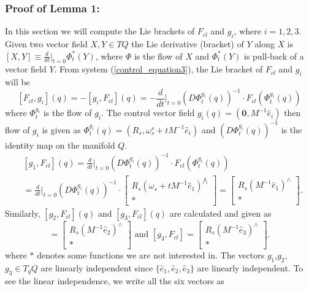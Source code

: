 \documentclass{ifacconf}
\begin{document}
\subsubsection{Proof of Lemma 1:} 
\label{A3}
In this section we will compute the Lie brackets of $F_{cl}$ and $g_{i}$, where $i=1,2,3$. Given two vector field $X,Y \in TQ$ the Lie derivative (bracket) of $Y$ along $X$ is $[X,Y] \equiv \frac{d}{dt}|_{t=0}\Phi_{t}^{*}(Y)$, 
where $\Phi$ is the flow of $X$ and $\Phi_{t}^{*}(Y)$ is pull-back of a vector field $Y$. From system (\ref{control_equation3}), the Lie bracket of $F_{cl}$ and $g_{i}$ will be
\begin{equation}\nonumber
[F_{cl},g_{i}](q) = -[g_{i},F_{cl}](q) = - \frac{d}{dt}|_{t=0} (D\Phi_{t}^{g_{i}}(q))^{-1}\cdot F_{cl}(\Phi_{t}^{g_{i}}(q))
\end{equation}
where $\Phi_{t}^{g_{i}}$ is the flow of $g_{i}$. The control vector field $g_{i}(q) = (\mathbf{0}, M^{-1}\hat{e}_{i})$  
then flow of $g_{i}$ is given as $\Phi_{t}^{g_{i}}(q) = \left(R_{s},\omega_{s}^{s} + t M^{-1}\hat{e}_{i}  \right)$ 
and $(D\Phi_{t}^{g_{i}}(q))^{-1}$ is the identity map on the manifold $Q$.
\begin{align*}
& [g_{1},F_{cl}](q) = \frac{d}{dt}|_{t=0} (D\Phi_{t}^{g_{i}}(q))^{-1}\cdot F_{cl}(\Phi_{t}^{g_{i}}(q)) \nonumber \\
& = \frac{d}{dt}|_{t=0} (D\Phi_{t}^{g_{i}}(q))^{-1}\cdot \begin{bmatrix}
R_{s}(\omega_{s} + t M^{-1}\hat{e}_{1})^{\bigwedge} \\
\ast
\end{bmatrix} = \begin{bmatrix}
R_{s}(M^{-1}\hat{e}_{1})^{\wedge}\\
\ast
\end{bmatrix}.
\end{align*}
Similarly, $[g_{2},F_{cl}](q)$ and $[g_{3},F_{cl}](q)$ are calculated and given as
\begin{equation*}
[g_{2},F_{cl}] = \begin{bmatrix}
R_{s}(M^{-1}\hat{e}_{2})^{\wedge}\\
\ast
\end{bmatrix}\mbox{   and   }
[g_{3},F_{cl}] = \begin{bmatrix}
R_{s}(M^{-1}\hat{e}_{3})^{\wedge}\\
\ast
\end{bmatrix}.
\end{equation*}
where $\ast$ denotes some functions we are not interested in. The vectors $g_{1}$,$g_{2}$,$g_{3}\in T_{q}Q$ are linearly independent since $\{\hat{e}_{1},\hat{e}_{2},\hat{e}_{3}\}$ are linearly independent. To see the linear independence, we write all the six vectors as
\end{document}
